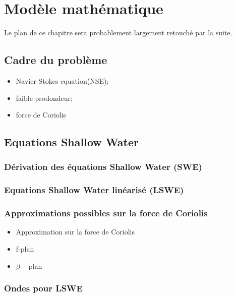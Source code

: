 
\chapter{Modèle mathématique}

Le plan de ce chapitre sera probablement largement retouché par la suite.

\section{Cadre du problème}

\begin{itemize}
\item Navier Stokes equation(NSE);
\item faible prodondeur;
\item force de Coriolis
\end{itemize}

\section{Equations Shallow Water}

\subsection{Dérivation des équations Shallow Water (SWE)}

\subsection{Equations Shallow Water linéarisé (LSWE)}

\subsection{Approximations possibles sur la force de Coriolis}

\begin{itemize}
\item Approximation sur la force de Coriolis
\item f-plan
\item $\beta-$plan
\end{itemize}

\subsection{Ondes pour LSWE}
